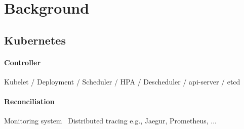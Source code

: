 \section{Background}
\label{sec:background}

\subsection*{Kubernetes}
\paragraph*{Controller}
Kubelet / Deployment / Scheduler / HPA / Descheduler / api-server / etcd
\paragraph*{Reconciliation}

Monitoring system \ Distributed tracing e.g., Jaegur, Prometheus, ...